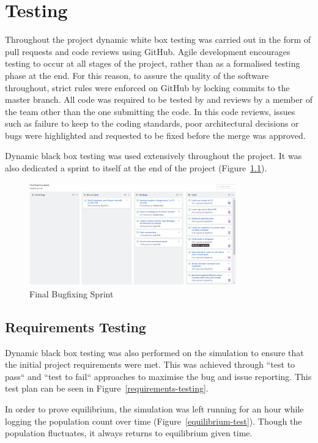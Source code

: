 \documentclass[a4paper, oneside, 11pt]{report}
\begin{document}
\chapter{Testing}\label{testing}
Throughout the project dynamic white box testing was carried out in the form of pull requests and code reviews using GitHub. Agile development encourages testing to occur at all stages of the project, rather than as a formalised testing phase at the end. For this reason, to assure the quality of the software throughout, strict rules were enforced on GitHub by locking commits to the master branch. All code was required to be tested by and reviews by a member of the team other than the one submitting the code. In this code reviews, issues such as failure to keep to the coding standards, poor architectural decisions or bugs were highlighted and requested to be fixed before the merge was approved.

Dynamic black box testing was used extensively throughout the project. It was also dedicated a sprint to itself at the end of the project (Figure~\ref{gitbugfixing}).

\begin{figure}[H]
	\caption{Final Bugfixing Sprint}\label{gitbugfixing}
	\centering
	\includegraphics[width=0.8\textwidth]{gitbugfixing}
\end{figure}

\section{Requirements Testing}
Dynamic black box testing was also performed on the simulation to ensure that the initial project requirements were met. This was achieved through ``test to pass`` and ``test to fail`` approaches to maximise the bug and issue reporting. This test plan can be seen in Figure~\ref{requirements-testing}.

In order to prove equilibrium, the simulation was left running for an hour while logging the population count over time (Figure~\ref{equilibrium-test}). Though the population fluctuates, it always returns to equilibrium given time.
	
\end{document}
